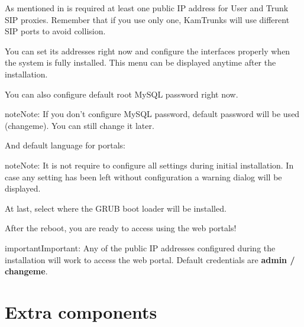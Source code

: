 \documentclass[letterpaper,10pt,english]{sphinxmanual}
\begin{document}
\noindent{}

As mentioned in {\hyperref[basic_concepts/installation/requirements:minimum\string-requirements]{}} is required at least one public IP
address for User and Trunk SIP proxies. Remember that if you use only one,
KamTrunks will use different SIP ports to avoid collision.

You can set its addresses right now and configure the interfaces properly when
the system is fully installed. This menu can be displayed anytime after the
installation.

\noindent{}

You can also configure default root MySQL password right now.

\begin{notice}{note}{Note:}
If you don't configure MySQL password, default password will be used
(changeme). You can still change it later.
\end{notice}

\noindent{}

And default language for portals:

\noindent{}

\begin{notice}{note}{Note:}
It is not require to configure all settings during initial
installation. In case any setting has been left without configuration a
warning dialog will be displayed.
\end{notice}

\noindent{}

At last, select where the GRUB boot loader will be installed.

\noindent{}

After the reboot, you are ready to access using the web portals!

\begin{notice}{important}{Important:}
Any of the public IP addresses configured during the
installation will work to access the web portal. Default credentials are
\textbf{admin / changeme}.
\end{notice}


\section{Extra components}
\label{basic_concepts/installation/extra_components::doc}\label{basic_concepts/installation/extra_components:extra-components}
\end{document}
